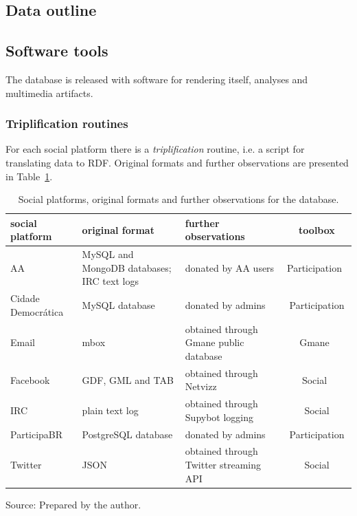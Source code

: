 \subsection{Data outline}


\subsection{Software tools}
The database is released with software for rendering itself, analyses and
multimedia artifacts.
\subsubsection{Triplification routines}
For each social platform there is a \emph{triplification} routine,
i.e. a script for translating data to RDF.
Original formats and further observations are presented in
Table~\ref{tab:provenance}.
\begin{table}[h!]\scriptsize
	\begin{center}
		\caption{Social platforms, original formats and further observations for
		the database.}\label{tab:provenance}
		\begin{tabular}{| l || p{3cm} | p{3cm} | c |}\hline
			\textbf{social platform} & \textbf{original format} & \textbf{further observations} & \textbf{toolbox} \\\hline\hline
			AA & MySQL and MongoDB databases; IRC text logs & donated by AA users & Participation~\cite{participation} \\\hline
			Cidade Democrática & MySQL database & donated by admins & Participation \\\hline
			Email & mbox & obtained through Gmane public database & Gmane~\cite{gmane} \\\hline
			Facebook & GDF, GML and TAB & obtained through Netvizz~\cite{netvizz} & Social~\cite{social} \\\hline
			IRC & plain text log & obtained through Supybot logging & Social \\\hline
			ParticipaBR & PostgreSQL database & donated by admins & Participation \\\hline
			Twitter & JSON & obtained through Twitter streaming API & Social \\\hline
		\end{tabular}
		\begin{flushleft}
			Source: Prepared by the author.\
		\end{flushleft}
	\end{center}
\end{table} 


